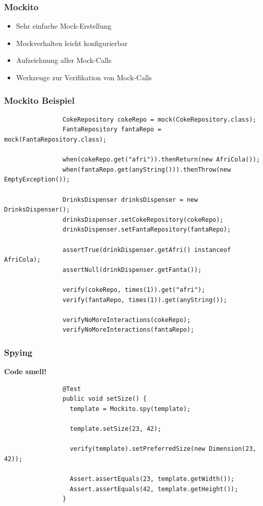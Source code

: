 \documentclass{beamer}
\begin{document}
			\begin{frame}
				\frametitle{Mockito}

				\begin{itemize}
					\item{Sehr einfache Mock-Erstellung}
					\item{Mockverhalten leicht konfigurierbar}
					\item{Aufzeichnung aller Mock-Calls}
					\item{Werkzeuge zur Verifikation von Mock-Calls}
				\end{itemize}
			\end{frame}

			\begin{frame}[fragile]
				\frametitle{Mockito Beispiel}
				\begin{lstlisting}
				CokeRepository cokeRepo = mock(CokeRepository.class);
				FantaRepository fantaRepo = mock(FantaRepository.class);

				when(cokeRepo.get("afri")).thenReturn(new AfriCola());
				when(fantaRepo.get(anyString())).thenThrow(new EmptyException());

				DrinksDispenser drinksDispenser = new DrinksDispenser();
				drinksDispenser.setCokeRepository(cokeRepo);
				drinksDispenser.setFantaRepository(fantaRepo);

				assertTrue(drinkDispenser.getAfri() instanceof AfriCola);
				assertNull(drinkDispenser.getFanta());

				verify(cokeRepo, times(1)).get("afri");
				verify(fantaRepo, times(1)).get(anyString());

				verifyNoMoreInteractions(cokeRepo);
				verifyNoMoreInteractions(fantaRepo);
				\end{lstlisting}
				
			\end{frame}

			\begin{frame}[fragile]
				\frametitle{Spying}
				\color{red}\textbf{Code smell!}
				\color{black}
				\begin{lstlisting}
				@Test
				public void setSize() {
				  template = Mockito.spy(template);

				  template.setSize(23, 42);

				  verify(template).setPreferredSize(new Dimension(23, 42));

				  Assert.assertEquals(23, template.getWidth());
				  Assert.assertEquals(42, template.getHeight());
				}
				\end{lstlisting}
			\end{frame}
\end{document}
